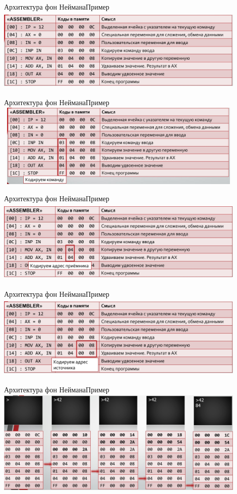 \begin{frame}[fragile]{Архитектура фон Неймана}{Пример}
\includegraphics[width=12cm, height=4cm]{Term_1/Source/Pirctures/example.jpg}
\end{frame}

\begin{frame}[fragile]{Архитектура фон Неймана}{Пример}
\includegraphics[width=12cm, height=4cm]{Term_1/Source/Pirctures/example1.jpg}
\end{frame}

\begin{frame}[fragile]{Архитектура фон Неймана}{Пример}
\includegraphics[width=12cm, height=4cm]{Term_1/Source/Pirctures/example2.jpg}
\end{frame}

\begin{frame}[fragile]{Архитектура фон Неймана}{Пример}
\includegraphics[width=12cm, height=4cm]{Term_1/Source/Pirctures/example3.jpg}
\end{frame}

\begin{frame}[fragile]{Архитектура фон Неймана}{Пример}
\includegraphics[width=12cm, height=5cm]{Term_1/Source/Pirctures/example-run.jpg}
\end{frame}